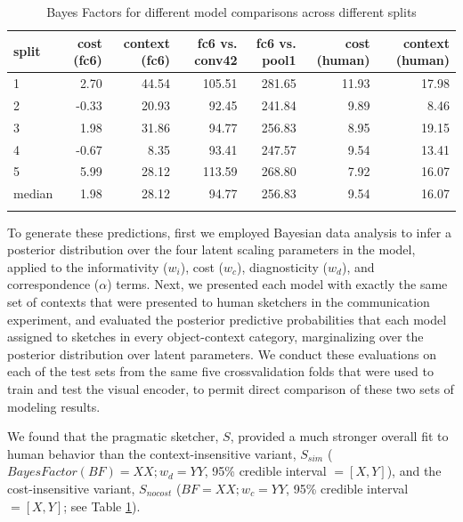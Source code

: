 \documentclass[9pt,twocolumn,twoside]{pnas-new}
\begin{document}
\begin{table}[ht]
\centering
\begin{tabular}{lrrrrrr}
  \hline
split & \multicolumn{1}{p{0.35in}}{\centering cost (fc6)} & \multicolumn{1}{p{0.35in}}{\centering context (fc6)} & \multicolumn{1}{p{0.35in}}{\centering fc6 vs. conv42} & \multicolumn{1}{p{0.35in}}{\centering fc6 vs. pool1} & \multicolumn{1}{p{0.35in}}{\centering cost (human)} & \multicolumn{1}{p{0.35in}}{\centering context (human)} \\ 
  \hline
1 & 2.70 & 44.54 & 105.51 & 281.65 & 11.93 & 17.98 \\ 
  2 & -0.33 & 20.93 & 92.45 & 241.84 & 9.89 & 8.46 \\ 
  3 & 1.98 & 31.86 & 94.77 & 256.83 & 8.95 & 19.15 \\ 
  4 & -0.67 & 8.35 & 93.41 & 247.57 & 9.54 & 13.41 \\ 
  5 & 5.99 & 28.12 & 113.59 & 268.80 & 7.92 & 16.07 \\ 
  median & 1.98 & 28.12 & 94.77 & 256.83 & 9.54 & 16.07 \\ 
  \hline
  \caption{Bayes Factors for different model comparisons across different splits}
\label{model_comparison}
\end{tabular}
\end{table}

To generate these predictions, first we employed Bayesian data analysis to infer a posterior distribution over the four latent scaling parameters in the model, applied to the informativity ($w_{i}$), cost ($w_{c}$), diagnosticity ($w_{d}$), and correspondence ($\alpha$) terms. 
Next, we presented each model with exactly the same set of contexts that were presented to human sketchers in the communication experiment, and evaluated the posterior predictive probabilities that each model assigned to sketches in every object-context category, marginalizing over the posterior distribution over latent parameters. 
We conduct these evaluations on each of the test sets from the same five crossvalidation folds that were used to train and test the visual encoder, to permit direct comparison of these two sets of modeling results. 

We found that the pragmatic sketcher, $S$, provided a much stronger overall fit to human behavior than the context-insensitive variant, $S_{sim}$ ($Bayes Factor (BF) = XX; w_d = YY$, 95\% credible interval $= [X, Y]$), and the cost-insensitive variant, $S_{nocost}$ ($BF = XX; w_c = YY$, 95\% credible interval $=[X, Y]$; see Table \ref{model_comparison}). 
\end{document}
